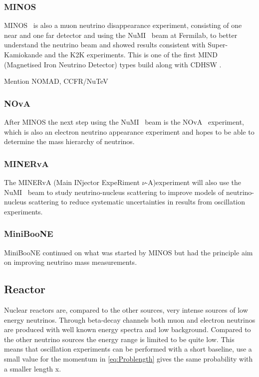 \subsubsection{MINOS}
MINOS~\cite{MINOS} is also a muon neutrino disappearance experiment, consisting of one near and one far detector and using the NuMI~\cite{19NuMI} beam at Fermilab, to better understand the neutrino beam and showed results consistent with Super-Kamiokande and the K2K experiments. This is one of the first MIND (Magnetised Iron Neutrino Detector) types build along with CDHSW \cite{40CDHSW}. 

Mention NOMAD, CCFR/NuTeV

\subsubsection{NOvA}
After MINOS the next step using the NuMI~\cite{19NuMI} beam is the NOvA~\cite{18nova} experiment, which is also an electron neutrino appearance experiment and hopes to be able to determine the mass hierarchy of neutrinos.

\subsubsection{MINERvA}
The MINERvA (Main INjector ExpeRiment $\nu$-A)experiment \cite{39minerva} will also use the NuMI~\cite{19NuMI} beam to study neutrino-nucleus scattering to improve models of neutrino-nucleus scattering to reduce systematic uncertainties in results from oscillation experiments.

\subsubsection{MiniBooNE}
MiniBooNE\cite{41MiniBooNE} continued on what was started by MINOS but had the principle aim on improving neutrino mass measurements.

\fi

\subsection{Reactor}
Nuclear reactors are, compared to the other sources, very intense sources of low energy neutrinos. Through beta-decay channels both muon and electron neutrinos are produced with well known energy spectra and low background. Compared to the other neutrino sources the energy range is limited to be quite low. This means that oscillation experiments can be performed with a short baseline, use a small value for the momentum in \ref{eq:Problength} gives the same probability with a smaller length x.

